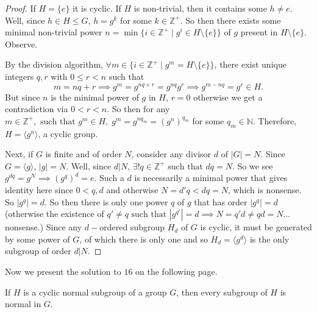 \documentclass[addpoints,10pt]{exam}
\theoremstyle{plain}
\theoremstyle{definition}
\newtheorem{prob}[thm]{Problem}
\theoremstyle{plain}
\theoremstyle{plain}
\theoremstyle{definition}
\let\oldprob\prob
\let\endoldprob\endprob
\renewenvironment{prob}
  {\begin{singlespace}\oldprob}
  {\endoldprob\end{singlespace}}
\newcommand{\NN}{\ensuremath{\mathbb{N}}}
\newcommand{\ZZ}{\ensuremath{\mathbb{Z}}}
\begin{document}
\begin{proof}
  If $H=\{e\}$ it is cyclic. If $H$ is non-trivial, then it contains some $h\neq e.$ Well, since $h\in H\leq G$, $h=g^{k}$ for some $k\in\ZZ^{+}$. So then there exists some minimal non-trivial power $n=\min \{i\in \ZZ^{+}\mid g^{i}\in H\setminus \{e\}\}$ of $g$ present in $H\setminus\{e\}$. Observe.

  By the division algorithm, $\forall m\in \{i\in \ZZ^{+}\mid g^{m}=H\setminus\{e\}\}$, there exist unique integers $q,r$ with $0\leq r<n$ such that
  $$m=nq+r\implies g^{m}=g^{nq+r}=g^{nq}g^{r}\implies g^{m-nq}=g^{r}\in H.$$
  But since $n$ is the minimal power of $g$ in $H$, $r=0$ otherwise we get a contradiction via $0<r<n$. So then for any $m\in \ZZ^{+},\text{ such that }g^{m}\in H,\;g^{m}=g^{nq_{m}}=(g^{n})^{q_{m}}$ for some $q_{m}\in \NN$. Therefore, $H=\langle g^{n}\rangle$, a cyclic group.

  Next, if $G$ is finite and of order $N$, consider any divisor $d$ of $|G|=N$. Since $G=\langle g\rangle$, $|g|=N$. Well, since $d|N,\,\exists!q\in \ZZ^{+}\text{ such that }dq=N$. So we see $g^{dq}=g^{N}\implies (g^{q})^{d}=e$. Such a $d$ is necessarily a minimal power that gives identity here since $0<q,d$ and otherwise $N=d'q<dq=N$, which is nonsense. So $|g^{q}|=d.$ So then there is only one power $q$ of $g$ that has order $|g^{q}|=d$ (otherwise the existence of $q'\neq q\text{ such that }|g^{q'}|=d\implies N=q'd\neq qd=N$... nonsense.) Since any $d-$ordered subgroup $H_{d}$ of $G$ is cyclic, it must be generated by some power of $G$, of which there is only one and so $H_{d}=\langle g^{d}\rangle$ is the only subgroup of order $d|N.$ 
\end{proof}
Now we present the solution to $16$ on the following page.
\newpage
\begin{prob}
  If $H$ is a cyclic normal subgroup of a group $G$, then every subgroup of $H$ is normal in $G$.
\end{prob}
\end{document}
